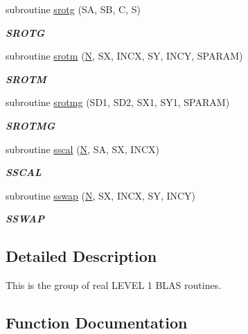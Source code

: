 \begin{DoxyCompactItemize}
subroutine \hyperlink{group__single__blas__level1_ga2f65d66137ddaeb7ae93fcc4902de3fc}{srotg} (S\+A, S\+B, C, S)
\begin{DoxyCompactList}\small\item\em {\bfseries S\+R\+O\+T\+G} \end{DoxyCompactList}\item 
subroutine \hyperlink{group__single__blas__level1_ga5633344a5729b4f0167aa441dcf95a9c}{srotm} (\hyperlink{polmisc_8c_a0240ac851181b84ac374872dc5434ee4}{N}, S\+X, I\+N\+C\+X, S\+Y, I\+N\+C\+Y, S\+P\+A\+R\+A\+M)
\begin{DoxyCompactList}\small\item\em {\bfseries S\+R\+O\+T\+M} \end{DoxyCompactList}\item 
subroutine \hyperlink{group__single__blas__level1_ga97ce4e31b77723a3b60fb3f479f61316}{srotmg} (S\+D1, S\+D2, S\+X1, S\+Y1, S\+P\+A\+R\+A\+M)
\begin{DoxyCompactList}\small\item\em {\bfseries S\+R\+O\+T\+M\+G} \end{DoxyCompactList}\item 
subroutine \hyperlink{group__single__blas__level1_ga3252f1f70b29d59941e9bc65a6aefc0a}{sscal} (\hyperlink{polmisc_8c_a0240ac851181b84ac374872dc5434ee4}{N}, S\+A, S\+X, I\+N\+C\+X)
\begin{DoxyCompactList}\small\item\em {\bfseries S\+S\+C\+A\+L} \end{DoxyCompactList}\item 
subroutine \hyperlink{group__single__blas__level1_ga0a2eaca94b4941dbc351157126cbb0f6}{sswap} (\hyperlink{polmisc_8c_a0240ac851181b84ac374872dc5434ee4}{N}, S\+X, I\+N\+C\+X, S\+Y, I\+N\+C\+Y)
\begin{DoxyCompactList}\small\item\em {\bfseries S\+S\+W\+A\+P} \end{DoxyCompactList}\end{DoxyCompactItemize}


\subsection{Detailed Description}
This is the group of real L\+E\+V\+E\+L 1 B\+L\+A\+S routines. 

\subsection{Function Documentation}
\hypertarget{group__single__blas__level1_gafc5e1e8d9f26907c0a7cf878107f08cf}{}
